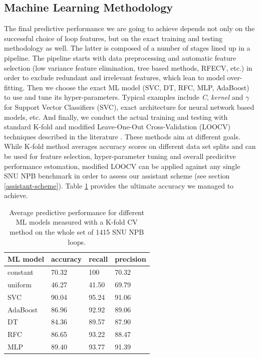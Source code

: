 \documentclass{acaces}
\begin{document}
\subsection{Machine Learning Methodology}
\label{ml-methodology}
\quad The final predictive performance we are going to achieve depends not only on the successful choice of loop features, but on the exact training and testing methodology as well. The latter is composed of a number of stages lined up in a pipeline. The pipeline starts with data preprocessing and automatic feature selection (low variance feature elimination, tree based methods, RFECV, etc.) in order to exclude redundant and irrelevant features, which lean to model over-fitting. Then we choose the exact ML model (SVC, DT, RFC, MLP, AdaBoost) to use and tune its hyper-parameters. Typical examples include \textit{C}, \textit{kernel} and $\gamma$ for Support Vector Classifiers (SVC), exact architecture for neural network based models, etc. And finally, we conduct the actual training and testing with standard K-fold and modified Leave-One-Out Cross-Validation (LOOCV)  techniques described in the literature \cite{James:2014:ISL:2517747}. These methods aim at different goals. While K-fold method averages accuracy scores on different data set splits and can be used for feature selection, hyper-parameter tuning and overall predicitve performance estomation, modified LOOCV can be applied against any single SNU NPB benchmark in order to assess our assistant scheme (see section \ref{assistant-scheme}). Table \ref{tab:accuracy} provides the ultimate accuracy we managed to achieve.

\begin{table}
	\centering
	\begin{tabular}[c]{|p{1.5cm}|p{1.5cm}|p{1.5cm}|p{1.5cm}|}
		\hline
		ML model & accuracy & recall & precision \\
		\hline
		constant & 70.32 & 100 & 70.32\\
		\hline
		uniform & 46.27 & 41.50 & 69.79\\
		\hline
		SVC & 90.04 & 95.24 & 91.06 \\
		\hline
		AdaBoost & 86.96 & 92.92 & 89.06 \\
		\hline
		DT & 84.36 & 89.57 & 87.90 \\
		\hline
		RFC & 86.65 & 93.22 & 88.47 \\
		\hline
		MLP & 89.40 & 93.77 & 91.39 \\
		\hline
	\end{tabular}
	\caption{Average predictive performance for different ML models measured with a K-fold CV method on the whole set of 1415 SNU NPB loops.}
	\label{tab:accuracy}
\end{table}
\end{document}

